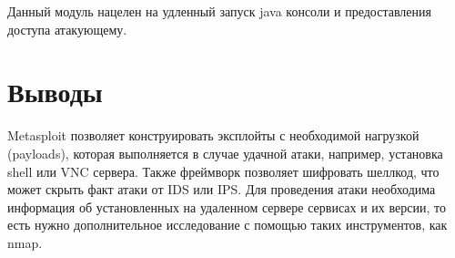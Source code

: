\documentclass[10pt,a4paper]{article}
\begin{document}
Данный модуль нацелен на удленный запуск java консоли и предоставления доступа атакующему.
 
 
\section{Выводы} 
Metasploit позволяет конструировать эксплойты с необходимой нагрузкой (payloads), которая выполняется в случае удачной атаки, например, установка shell или VNC сервера. Также фреймворк позволяет шифровать шеллкод, что может скрыть факт атаки от IDS или IPS. Для проведения атаки необходима информация об установленных на удаленном сервере сервисах и их версии, то есть нужно дополнительное исследование с помощью таких инструментов, как nmap.

 
\end{document}
